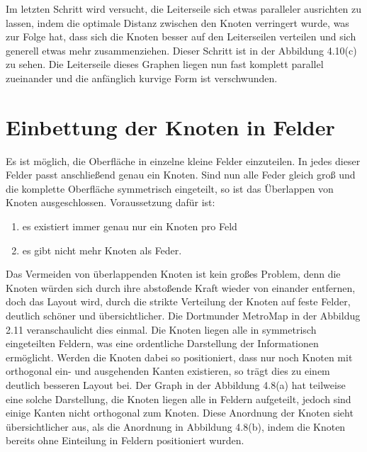 Im letzten Schritt wird versucht, die Leiterseile sich etwas paralleler ausrichten zu lassen, indem die optimale Distanz zwischen den Knoten verringert wurde, was zur Folge hat, dass sich die Knoten besser auf den Leiterseilen verteilen und sich generell etwas mehr zusammenziehen. Dieser Schritt ist in der Abbildung 4.10(c) zu sehen. Die Leiterseile dieses Graphen liegen nun fast komplett parallel zueinander und die anfänglich kurvige Form ist verschwunden. \\

\section{Einbettung der Knoten in Felder}
\label{Kapitel_4_-_Unterkapitel_4}

Es ist möglich, die Oberfläche in einzelne kleine Felder einzuteilen. In jedes dieser Felder passt anschließend genau ein Knoten. Sind nun alle Feder gleich groß und die komplette Oberfläche symmetrisch eingeteilt, so ist das Überlappen von Knoten ausgeschlossen. Voraussetzung dafür ist:

\begin{enumerate}
	\item es existiert immer genau nur ein Knoten pro Feld
	\item es gibt nicht mehr Knoten als Feder.
\end{enumerate} 

Das Vermeiden von überlappenden Knoten ist kein großes Problem, denn die Knoten würden sich durch ihre abstoßende Kraft wieder von einander entfernen, doch das Layout wird, durch die strikte Verteilung der Knoten auf feste Felder, deutlich schöner und übersichtlicher. Die Dortmunder MetroMap in der Abbildug 2.11 veranschaulicht dies einmal. Die Knoten liegen alle in symmetrisch eingeteilten Feldern, was eine ordentliche Darstellung der Informationen ermöglicht. Werden die Knoten dabei so positioniert, dass nur noch Knoten mit orthogonal ein- und ausgehenden Kanten existieren, so trägt dies zu einem deutlich besseren Layout bei. Der Graph in der Abbildung 4.8(a) hat teilweise eine solche Darstellung, die Knoten liegen alle in Feldern aufgeteilt, jedoch sind einige Kanten nicht orthogonal zum Knoten. Diese Anordnung der Knoten sieht übersichtlicher aus, als die Anordnung in Abbildung 4.8(b), indem die Knoten bereits ohne Einteilung in Feldern positioniert wurden. \\

